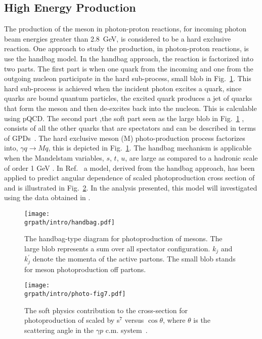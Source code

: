 \subsection{High Energy \piz Production}\label{sec:into:xsection.high}
The production of the \piz meson in photon-proton reactions, for incoming photon beam energies greater than 2.8~GeV, is considered to be a hard exclusive reaction. One approach to study the \piz production, in photon-proton reactions, is use the handbag model. In the handbag approach, the reaction is factorized into two parts. The first part is when one quark from the incoming and one from the outgoing nucleon participate in the hard sub-process, small blob in Fig.~\ref{fig:xsection.handbag}. This hard sub-process is achieved when the incident photon excites a quark, since quarks are bound quantum particles, the excited quark produces a jet of quarks that form the meson and then de-excites back into the nucleon. This is calculable using pQCD. The second part ,the soft part seen as the large blob in Fig.~\ref{fig:xsection.handbag} , consists of all the other quarks that are spectators and can be described in terms of GPDs~\cite{key1, key2,Rad1996, Diehl}. The hard exclusive meson (M) photo-production process factorizes into, $\gamma q \to Mq$, this is depicted in Fig.~\ref{fig:xsection.handbag}. The handbag mechanism is applicable when the Mandelstam variables, $s$, $t$, $u$, are large as compared to a hadronic scale of order 1 GeV . In Ref.~\cite{Huang2000} a model, derived from the handbag approach, has been applied to predict angular dependence of scaled photoproduction cross section of \piz and is illustrated in Fig.~\ref{fig:xsection.handbag.cal}. In the analysis presented, this model will investigated using the data obtained in .

\begin{figure}[h!]\begin{center}
\texttt{[image: \\grpath/intro/handbag.pdf]}
\caption[The handbag-type diagram for photoproduction of mesons]{\label{fig:xsection.handbag}	The handbag-type diagram for photoproduction of mesons. The large blob represents a sum over all spectator configuration. $k_j$ and $k_j^{\prime}$  denote the momenta of the active partons. The small blob stands for meson photoproduction off partons.}
\end{center}\end{figure}

\begin{figure}[h!]\begin{center}
\texttt{[image: \\grpath/intro/photo-fig7.pdf]}
\caption[The soft physics contribution to the cross-section for photoproduction of \piz]{\label{fig:xsection.handbag.cal}The soft physics contribution to the cross-section for photoproduction of \piz scaled by s$^7$ versus $\cos\theta$, where $\theta$ is the scattering angle in the $\gamma p$ c.m. system~\cite{Huang2000}.}
\end{center}\end{figure}
\FloatBarrier



